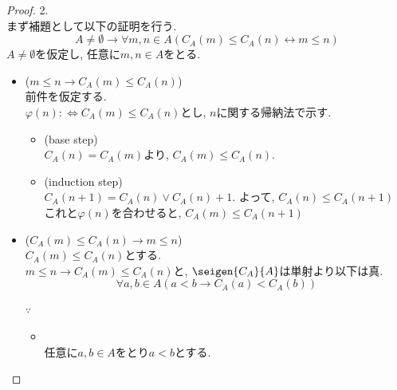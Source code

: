 \begin{proof} 2. \\
  まず補題として以下の証明を行う.
  \begin{equation*}
   A \neq \emptyset \rightarrow \forall m,n \in A(C_A(m) \leq C_A(n) \leftrightarrow m \leq n )
  \end{equation*}
  $A \neq \emptyset$を仮定し,
  任意に$m, n \in A$をとる.\\
  \begin{itemize}
      \item[]\hspace{-0.5cm} ($m \leq n \rightarrow C_A(m) \leq C_A(n)$)\\
        前件を仮定する.\\
        $\varphi (n) :\Leftrightarrow C_A(m) \leq C_A(n)$とし,
        $n$に関する帰納法で示す.\\
        \begin{itemize}
          \item[]\hspace{-0.5cm} (base step)\\
            $C_A(n) = C_A(m)$より,
            $C_A(m) \leq C_A(n)$.\\
          \item[]\hspace{-0.5cm} (induction step)\\
            $C_A(n + 1) = C_A(n) \lor C_A(n) + 1$.
            よって,
            $C_A(n) \leq C_A(n+1)$\\
            これと$\varphi (n)$を合わせると,
            $C_A(m) \leq C_A(n+1)$
        \end{itemize}
      \item[]\hspace{-0.5cm} ($C_A(m) \leq C_A(n)  \rightarrow m \leq n$)\\
        $C_A(m) \leq C_A(n)$とする.\\
        $m \leq n \rightarrow C_A(m) \leq C_A(n)$と,
        $\seigen {C_A}{A}$は単射より以下は真.
          \begin{equation}
            \forall a,b \in A(a < b \rightarrow C_A(a) < C_A(b))
          \end{equation}
        \begin{sub-block}{{\boldmath $\because$}\,}
          \begin{itemize}
            \item[] \hspace{-0.5cm} \\
              任意に$a,b \in A$をとり$a < b$とする.\\

\end{itemize}
\end{sub-block}
\end{itemize}
\end{proof}
